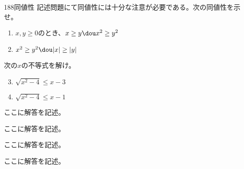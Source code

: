 \begin{thm}{188}{}{同値性}
 記述問題にて同値性には十分な注意が必要である。次の同値性を示せ。
 \begin{enumerate}
  \item $x, y\ge 0$のとき、$x\ge y \dou x^2\ge y^2$
  \item $x^2\ge y^2 \dou |x|\ge |y|$
 \end{enumerate}
 次の$x$の不等式を解け。
 \begin{enumerate}
  \setcounter{enumi}{2}
  \item $\sqrt{x^2-4}\le x-3$
  \item $\sqrt{x^2-4}\le x-1$
 \end{enumerate}
\end{thm}

ここに解答を記述。

ここに解答を記述。

ここに解答を記述。

ここに解答を記述。